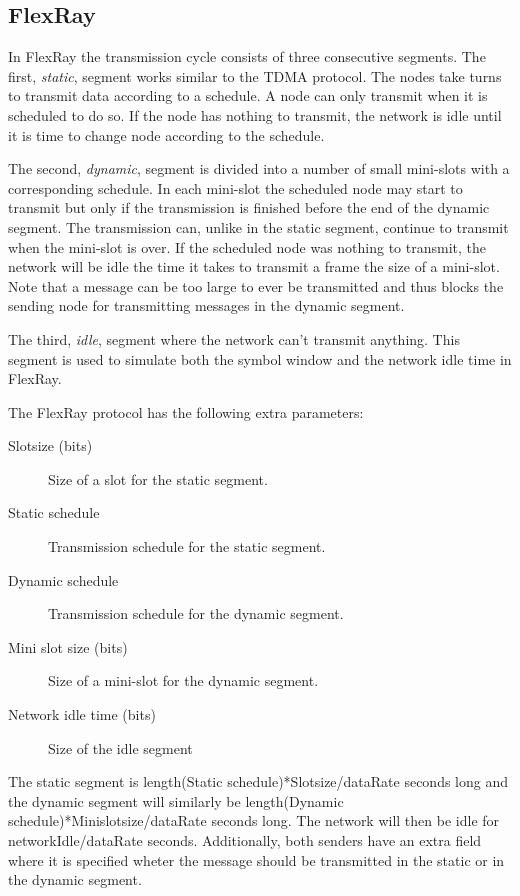 \documentclass[final,twoside]{rapport}
\begin{document}
\subsection{FlexRay}
In FlexRay the transmission cycle consists of three consecutive segments.
The first, \emph{static}, segment works similar to the TDMA protocol. The
nodes take turns to transmit data according to a schedule. A node can
only transmit when it is scheduled to do so. If the node has nothing
to transmit, the network is idle until it is time to change node
according to the schedule.  

The second, \emph{dynamic}, segment is divided into a number of small
mini-slots with a corresponding schedule. In each mini-slot the
scheduled node may start to transmit but only if the transmission is finished
before the end of the dynamic segment. The transmission can, unlike
in the static segment, continue to transmit when the mini-slot is
over. If the scheduled node was nothing to transmit, the network will
be idle the time it takes to transmit a frame the size of a mini-slot.
Note that a message can be too large to ever be transmitted and thus
blocks the sending node for transmitting messages in the dynamic segment. 

The third, \emph{idle}, segment where the network can't transmit anything.
This segment is used to simulate both the symbol window and the
network idle time in FlexRay.  

The FlexRay protocol has the following extra parameters:
\begin{description}
\item[Slotsize (bits)] Size of a slot for the static segment.
\item[Static schedule] Transmission schedule for the static segment.
\item[Dynamic schedule] Transmission schedule for the dynamic segment.
\item[Mini slot size (bits)] Size of a mini-slot for the dynamic
  segment. 
\item[Network idle time (bits)] Size of the idle segment
\end{description}
The static segment is length(Static schedule)*Slotsize/dataRate seconds
long and the dynamic segment will similarly be
length(Dynamic schedule)*Minislotsize/dataRate seconds long. The network will
then be idle for networkIdle/dataRate seconds. Additionally, both
senders have an extra field where it is specified wheter the message
should be transmitted in the static or in the dynamic segment. 
\end{document}
